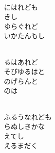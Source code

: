\documentclass[10pt,b5j]{tarticle} %
\begin{document}
\vspace{1.5em} %
\newcommand{\linespace}{0.5em} %
\newcommand{\blocksize}{0.5\hsize} %
\newcommand{\itemmargin}{3em} %
\begin{enumerate} %
    \setlength{\itemindent}{\itemmargin} %
    \begin{minipage}[c]{\blocksize}
    
        \vspace{\linespace}
        \item~\\
        にはれども\\
        きし\\
        ゆらぐれど\\
        いかたんもし
        
    \end{minipage}
    \begin{minipage}[c]{\blocksize}
        
        \vspace{\linespace}
        \item~\\
        るはあれど\\
        そびゆるはと\\
        のげらんと\\
        のは
        
    \end{minipage}
    \begin{minipage}[c]{\blocksize}
        
        \vspace{\linespace}
        \item~\\
        ふるうなれども\\
        らぬしきかな\\
        えてし\\
        えるまだく
        

\end{minipage}
\end{enumerate}
\end{document}
